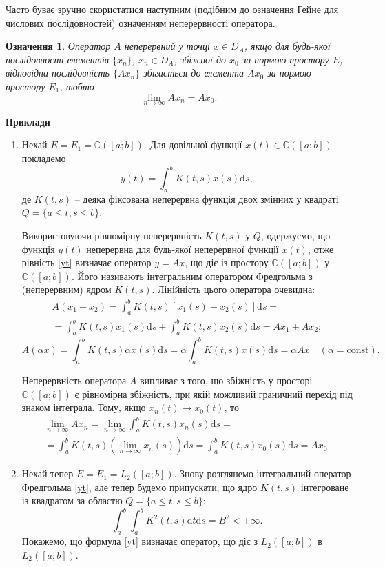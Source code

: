 \documentclass[14pt,twoside]{extreport}
\theoremstyle{mystyle}
\newtheorem{dfn}{Означення}
\numberwithin{equation}{chapter}
\newcommand{\cab}{\mathbb{C}([a; b])}
\begin{document}
Часто буває зручно скористатися наступним (подібним до означення Гейне для числових послідовностей) означенням неперервності оператора.

\begin{dfn}
	Оператор $A$ неперервний у точці $x\in D_A$, якщо для будь-якої послідовності елементів $\{x_n\}$, $x_n \in D_A$, збіжної до $x_0$ за нормою простору $E$, відповідна послідовність $\{Ax_n\}$ збігається до елемента $Ax_0$ за нормою простору $E_1$, тобто
	\[
	\lim_{n \to \infty} Ax_n = Ax_0.
	\]
\end{dfn}

\textbf{Приклади}
\begin{enumerate}
	\item Нехай $E= E_1 = \cab$. Для довільної функції $x(t) \in \cab$ покладемо
	\begin{equation}\label{yt}
	y(t) = \int_{a}^{b} K(t, s) x(s) \mathrm{d}s,
	\end{equation}
	де $K(t, s)$ -- деяка фіксована неперервна функція двох змінних у квадраті $Q=\{a\leqslant t, s \leqslant b\}$.
	
	Використовуючи рівномірну неперервність $K(t, s)$ у $Q$, одержуємо, що функція $y(t)$ неперервна для будь-якої неперервної функції $x(t)$, отже рівність \eqref{yt} визначає оператор $y=Ax$, що діє із простору $\cab$ у $\cab$. Його називають інтегральним оператором Фредгольма з (неперервним) ядром $K(t, s)$. Лінійність цього оператора очевидна:
	\begin{multline*}
	A(x_1+x_2) = \int_{a}^{b} K(t, s) [x_1(s) + x_2(s)] \mathrm{d}s =\\
	= \int_{a}^{b} K(t, s) x_1(s) \mathrm{d}s + \int_{a}^{b} K(t, s) x_2(s) \mathrm{d}s = Ax_1 + Ax_2;
	\end{multline*}
	\[
	A(\alpha x) = \int_{a}^{b} K(t, s) \alpha x(s) \mathrm{d}s = \alpha \int_{a}^{b} K(t, s) x(s) \mathrm{d}s = \alpha Ax \quad (\alpha = \textrm{const}).
	\]
	
	Неперервність оператора $A$ випливає з того, що збіжність у просторі $\cab$ є рівномірна збіжність, при якій можливий граничний перехід під знаком інтеграла. Тому, якщо $x_n(t) \to x_0(t)$, то
	\begin{multline*}
	\displaystyle \lim_{n\to \infty} Ax_n = \lim_{n \to \infty}\int_{a}^{b} K(t, s) x_n(s) \mathrm{d}s =\\
	\displaystyle=\int_{a}^{b} K(t, s) \left(\lim_{n \to \infty} x_n(s)\right) \mathrm{d}s = \int_{a}^{b} K(t, s) x_0(s) \mathrm{d}s = Ax_0.
	\end{multline*}
	\item Нехай тепер $E = E_1 = L_2 ([a; b])$. Знову розглянемо інтегральний оператор Фредгольма \eqref{yt}, але тепер будемо припускати, що ядро $K(t, s)$ інтегроване із квадратом за областю $Q=\{a\leqslant t, s \leqslant b\}$:
	\begin{equation}\label{ksquared}
	\int_{a}^{b} \int_{a}^{b} K^2 (t, s) \mathrm{d}t \mathrm{d}s = B^2 < +\infty.
	\end{equation}
	Покажемо, що формула \eqref{yt} визначає оператор, що діє з $L_2([a; b])$ в $L_2([a; b])$.
	

\end{enumerate}
\end{document}
